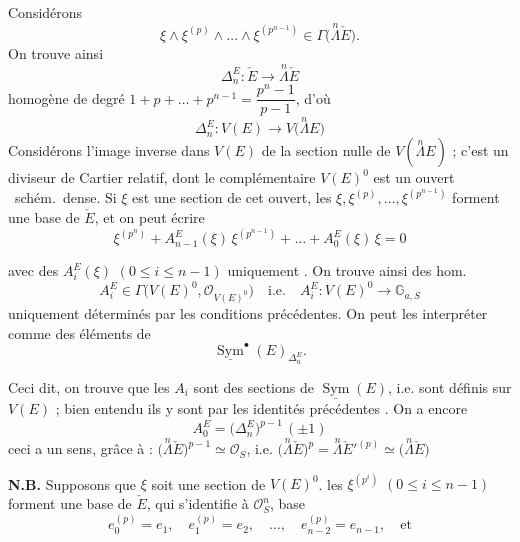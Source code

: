 \documentclass[11pt,a4paper]{article}
\begin{document}
Considérons
\[
  \xi \wedge \xi^{(p)} \wedge \dots \wedge \xi^{(p^{n-1})} \in \Gamma\bigl(\overset{n}{\Lambda}\check{E}\bigr) .
\]
On trouve ainsi 
\[
  \Delta^E_n : \check{E} \longrightarrow \overset{n}{\Lambda}\check{E}
\]
homogène de degré $1 + p + \dots + p^{n-1} = \dfrac{p^n - 1}{p - 1}$, d'où
\struck{\ill{}}
\[
  \Delta^E_n : V(E) \longrightarrow V\bigl(\overset{n}{\Lambda}E\bigr)
\]
 
Considérons l'image inverse dans $V(E)$ de la section nulle de
$V(\overset{n}{\Lambda}E)$ ; \struck{\ill{}} c'est un diviseur de Cartier relatif,
dont le complémentaire $V(E)^0$ est un ouvert \ schém.\ dense.
Si $\xi$ est une section de cet ouvert, les
$\xi, \xi^{(p)}, \dots, \xi^{(p^{n-1})}$ forment une base de $\check{E}$, et on peut
écrire
\[
  \xi^{(p^n)} + A^E_{n-1}(\xi)\,\xi^{(p^{n-1})} + \dots + A^E_0(\xi)\,\xi = 0
\]

avec des $A^E_i(\xi)$ $(0 \leqslant i \leqslant n-1)$ uniquement
. On trouve ainsi des hom.
\[
  A^E_i \in \Gamma\bigl(V(E)^0, \mathcal{O}_{V(E)^0}\bigr)
  \quad \text{i.e.} \quad A^E_i : V(E)^0 \longrightarrow \mathbb{G}_{a,S}
\]
uniquement déterminés par les conditions précédentes.
On peut les interpréter comme des éléments de
\[
  \underline{\operatorname{Sym}}^\bullet(E)_{\Delta^E_n} .
\]

Ceci dit, on trouve que les $A_i$ sont des sections de
$\underline{\operatorname{Sym}}(E)$, i.e. sont définis sur $V(E)$
 ; bien entendu ils y sont
 par les identités précédentes \struck{\ill{}}.
On a encore
\[
  A^E_0 = \bigl(\Delta^E_n\bigr)^{p-1}\,(\pm 1)
\]
\supplied{[}ceci a un sens, grâce à : $\bigl(\overset{n}{\Lambda}\check{E}\bigr)^{p-1} \simeq \mathcal{O}_S$,
i.e. $\bigl(\overset{n}{\Lambda}\check{E}\bigr)^{p} = \overset{n}{\Lambda}\check{E}'^{(p)}
\simeq \bigl(\overset{n}{\Lambda}\check{E}\bigr)$\add{]}

\textbf{N.B.} \struck{\ill{}} Supposons que $\xi$ soit une section de $V(E)^0$.
  les $\xi^{(p^i)}$ $(0 \leqslant i \leqslant n-1)$
forment une base de $\check{E}$, qui s'identifie à $\mathcal{O}_S^n$,
 \ill{} base \ill{}
\[
  e_0^{(p)} = e_1, \quad e_1^{(p)} = e_2, \quad \dots, \quad e_{n-2}^{(p)} = e_{n-1}, \quad \text{et}
\]
\end{document}
